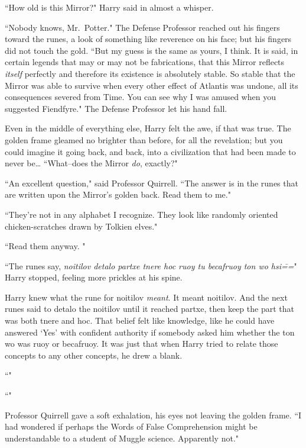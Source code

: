 ``How old is this Mirror?" Harry said in almost a whisper.

``Nobody knows, Mr.~Potter." The Defense Professor reached out his fingers toward the runes, a look of something like reverence on his face; but his fingers did not touch the gold. ``But my guess is the same as yours, I think. It is said, in certain legends that may or may not be fabrications, that this Mirror reflects \emph{itself} perfectly and therefore its existence is absolutely stable. So stable that the Mirror was able to survive when every other effect of Atlantis was undone, all its consequences severed from Time. You can see why I was amused when you suggested Fiendfyre." The Defense Professor let his hand fall.

Even in the middle of everything else, Harry felt the awe, if that was true. The golden frame gleamed no brighter than before, for all the revelation; but you could imagine it going back, and back, into a civilization that had been made to never be{\ldots} ``What\---does the Mirror \emph{do}, exactly?"

``An excellent question," said Professor Quirrell. ``The answer is in the runes that are written upon the Mirror's golden back. Read them to me."

``They're not in any alphabet I recognize. They look like randomly oriented chicken-scratches drawn by Tolkien elves."

``Read them anyway. "

``The runes say, \emph{noitilov detalo partxe tnere hoc ruoy tu becafruoy ton wo hsi\===}" Harry stopped, feeling more prickles at his spine.

Harry knew what the rune for noitilov \emph{meant}. It meant noitilov. And the next runes said to detalo the noitilov until it reached partxe, then keep the part that was both tnere and hoc. That belief felt like knowledge, like he could have answered `Yes' with confident authority if somebody asked him whether the ton wo was ruoy or becafruoy. It was just that when Harry tried to relate those concepts to any other concepts, he drew a blank.

``"

``"

Professor Quirrell gave a soft exhalation, his eyes not leaving the golden frame. ``I had wondered if perhaps the Words of False Comprehension might be understandable to a student of Muggle science. Apparently not."

